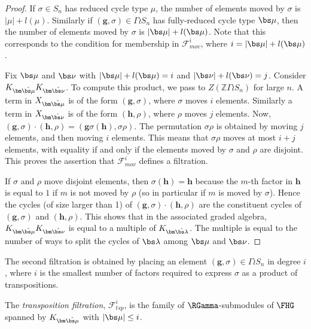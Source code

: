 \begin{proof}
If $\sigma \in S_n$ has reduced cycle type $\mu$, the number of elements moved by $\sigma$ is $|\mu| + l(\mu)$. Similarly if $(\mathbf{g}, \sigma) \in \Gamma \wr S_n$ has fully-reduced cycle type $\bs\mu$, then the number of elements moved by $\sigma$ is $|\bs \mu| + l(\bs \mu)$. Note that this corresponds to the condition for membership in $\mathcal{F}_{mov}^i$, where $i = |\bs \mu| + l(\bs \mu)$. 

Fix $\bs \mu$ and $\bs \nu$ with $|\bs \mu| + l(\bs \mu) = i$ and $|\bs \nu| + l(\bs \nu) = j$. Consider $K_{\bm\hat{\bs \mu}}K_{\bm\hat{\bs \nu}}$. To compute this product, we pass to $Z(\mathbb{Z}\Gamma \wr S_n)$ for large $n$. A term in $X_{\bm\hat{\bs \mu}}$ is of the form $(\mathbf{g}, \sigma)$, where $\sigma$ moves $i$ elements. Similarly a term in $X_{\bm\hat{\bs \nu}}$ is of the form $(\mathbf{h}, \rho)$, where $\rho$ moves $j$ elements. Now, $(\mathbf{g}, \sigma) \cdot (\mathbf{h}, \rho) = (\mathbf{g}\sigma(\mathbf{h}), \sigma\rho)$. The permutation $\sigma \rho$ is obtained by moving $j$ elements, and then moving $i$ elements. This means that $\sigma \rho$ moves at most $i+j$ elements, with equality if and only if the elements moved by $\sigma$ and $\rho$ are disjoint. This proves the assertion that $\mathcal{F}_{mov}^i$ defines a filtration.

If $\sigma$ and $\rho$ move disjoint elements, then $\sigma(\mathbf{h}) = \mathbf{h}$ because the $m$-th factor in $\mathbf{h}$ is equal to $1$ if $m$ is not moved by $\rho$ (so in particular if $m$ is moved by $\sigma$). Hence the cycles (of size larger than 1) of $(\mathbf{g}, \sigma) \cdot (\mathbf{h}, \rho)$ are the constituent cycles of $(\mathbf{g}, \sigma)$ and $(\mathbf{h}, \rho)$. This shows that in the associated graded algebra, $K_{\bm\hat{\bs \mu}}K_{\bm\hat{\bs \nu}}$ is equal to a multiple of $K_{\bm\hat{\bs \lambda}}$. The multiple is equal to the number of ways to split the cycles of $\bs \lambda$ among $\bs \mu$ and $\bs \nu$.
\end{proof}


The second filtration is obtained by placing an element $(\mathbf{g}, \sigma) \in \Gamma \wr S_n$ in degree $i$, where $i$ is the smallest number of factors required to express $\sigma$ as a product of transpositions. 
\begin{definition}
The \emph{transposition filtration}, $\mathcal{F}_{tsp}^i$, is the family of $\RGamma$-submodules of $\FHG$ spanned by $K_{\bm\hat{\bs \mu}}$ with $|\bs \mu| \leq i$.
\end{definition}




